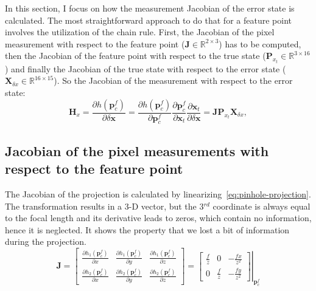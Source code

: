 In this section, I focus on how the measurement Jacobian of the error state is calculated. The most straightforward approach to do that for a feature point involves the utilization of the chain rule. First, the Jacobian of the pixel measurement with respect to the feature point ($\mathbf{J}\in\mathbb{R}^{2\times3}$) has to be computed, then the Jacobian of the feature point with respect to the true state ($\mathbf{P}_{x_t}\in\mathbb{R}^{3\times 16}$) and finally the Jacobian of the true state with respect to the error state ($\mathbf{X}_{\delta x}\in\mathbb{R}^{16\times 15}$). So the Jacobian of the measurement with respect to the error state:
\begin{equation}
    \mathbf{H}_x=\frac{\partial h(\mathbf{p}_c^f)}{\partial\delta\mathbf{x}}= 
    \frac{\partial h(\mathbf{p}_c^f)}{\partial\mathbf{p}_c^f}
    \frac{\partial\mathbf{p}_c^f}{\partial\mathbf{x}_t}
    \frac{\partial\mathbf{x}_t}{\partial\delta\mathbf{x}} =\mathbf{J}\mathbf{P}_{x_t}\mathbf{X}_{\delta x},
\end{equation} 

\subsection*{Jacobian of the pixel measurements with respect to the feature point}

The Jacobian of the projection is calculated by linearizing~\eqref{eq:pinhole-projection}. The transformation results in a 3-D vector, but the 3$^{rd}$ coordinate is always equal to the focal length and its derivative leads to zeros, which contain no information, hence it is neglected. It shows the property that we lost a bit of information during the projection.
\begin{equation}
    \mathbf{J}=\begin{bmatrix}
        \frac{\partial h_1(\mathbf{p}_c^f)}{\partial x} & \frac{\partial h_1(\mathbf{p}_c^f)}{\partial y} & \frac{\partial h_1(\mathbf{p}_c^f)}{\partial z} \\
        \frac{\partial h_2(\mathbf{p}_c^f)}{\partial x} & \frac{\partial h_2(\mathbf{p}_c^f)}{\partial y} & \frac{\partial h_2(\mathbf{p}_c^f)}{\partial z}
    \end{bmatrix} = \left.\begin{bmatrix}
        \frac{f}{z} & 0 & -\frac{fx}{z^2} \\
        0 & \frac{f}{z} & -\frac{fy}{z^2}
    \end{bmatrix}\right\vert_{\mathbf{p}_c^f}
    \label{eq:p-der-by-xt}
\end{equation}

